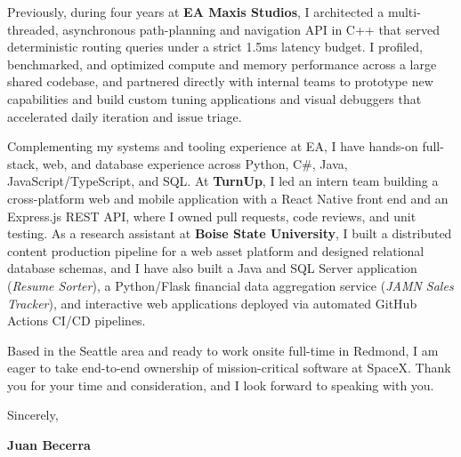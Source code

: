 \documentclass[letterpaper,11pt]{article}
\begin{document}
Previously, during four years at \textbf{EA Maxis Studios}, I architected a multi-threaded, asynchronous
path-planning and navigation API in C++ that served deterministic routing queries under a strict 1.5ms latency
budget. I profiled, benchmarked, and optimized compute and memory performance across a large shared codebase,
and partnered directly with internal teams to prototype new capabilities and build custom tuning applications
and visual debuggers that accelerated daily iteration and issue triage.

Complementing my systems and tooling experience at EA, I have hands-on full-stack, web, and database
experience across Python, C\#, Java, JavaScript/TypeScript, and SQL. At \textbf{TurnUp}, I led an intern team
building a cross-platform web and mobile application with a React Native front end and an Express.js REST
API, where I owned pull requests, code reviews, and unit testing. As a research assistant at \textbf{Boise State
University}, I built a distributed content production pipeline for a web asset platform and designed
relational database schemas, and I have also built a Java and SQL Server application (\emph{Resume Sorter}),
a Python/Flask financial data aggregation service (\emph{JAMN Sales Tracker}), and interactive web
applications deployed via automated GitHub Actions CI/CD pipelines.

Based in the Seattle area and ready to work onsite full-time in Redmond, I am eager to take end-to-end
ownership of mission-critical software at SpaceX. Thank you for your time and consideration, and I look
forward to speaking with you.

\vspace{10pt}
\noindent Sincerely,

\vspace{14pt}
\noindent \textbf{Juan Becerra}
\end{document}
